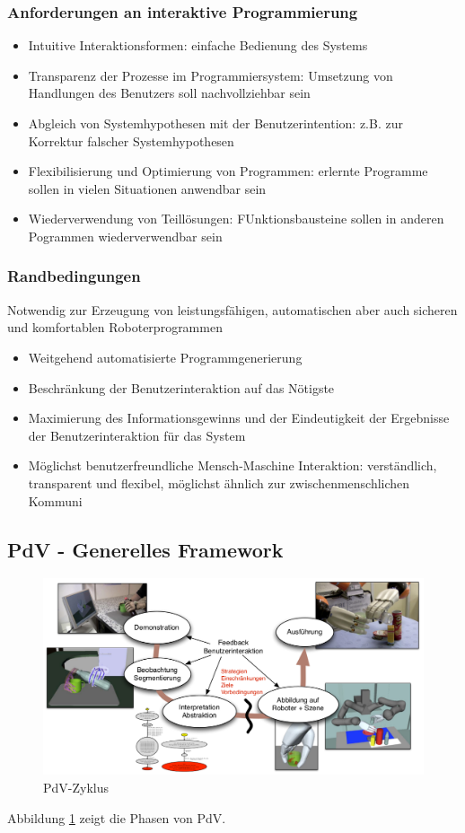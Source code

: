 \subsubsection*{Anforderungen an interaktive Programmierung}
\begin{itemize}
\item[1.]Intuitive Interaktionsformen: einfache Bedienung des Systems
\item[2.]Transparenz der Prozesse im Programmiersystem: Umsetzung von Handlungen des Benutzers soll nachvollziehbar sein
\item[3.]Abgleich von Systemhypothesen mit der Benutzerintention: z.B. zur Korrektur falscher Systemhypothesen
\item[4.]Flexibilisierung und Optimierung von Programmen: erlernte Programme sollen in vielen Situationen anwendbar sein
\item[5.]Wiederverwendung von Teillösungen: FUnktionsbausteine sollen in anderen Pogrammen wiederverwendbar sein
\end{itemize}

\subsubsection*{Randbedingungen}
Notwendig zur Erzeugung von leistungsfähigen, automatischen aber auch sicheren und komfortablen Roboterprogrammen
\begin{itemize}
\item[1.]Weitgehend automatisierte Programmgenerierung
\item[2.]Beschränkung der Benutzerinteraktion auf das Nötigste
\item[3.]Maximierung des Informationsgewinns und der Eindeutigkeit der Ergebnisse der Benutzerinteraktion für das System
\item[4.]Möglichst benutzerfreundliche Mensch-Maschine Interaktion: verständlich, transparent und flexibel, möglichst ähnlich zur zwischenmenschlichen Kommuni
\end{itemize}

\subsection{PdV - Generelles Framework}
\begin{figure}[ht]\centering 
\includegraphics[width=0.6\linewidth]{figures/ch03_zyklus.png}
\caption{PdV-Zyklus}
\label{fig:ch03_zykl}
\end{figure}
Abbildung  \ref{fig:ch03_zykl} zeigt die Phasen von PdV.
